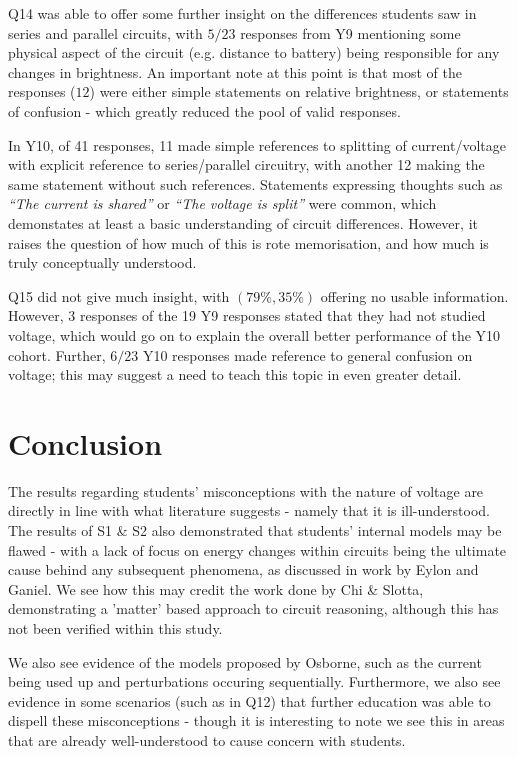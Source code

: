 \documentclass[a4paper,openany,nobib]{tufte-book}
\begin{document}

Q14 was able to offer some further insight on the differences students saw in series and parallel circuits, with $5/23 $ responses from Y9 mentioning some physical aspect of the circuit (e.g. distance to battery) being responsible for any changes in brightness. An important note at this point is that most of the responses ($12$) were either simple statements on relative brightness, or statements of confusion - which greatly reduced the pool of valid responses.

In Y10, of 41 responses, 11 made simple references to splitting of current/voltage with explicit reference to series/parallel circuitry, with another 12 making the same statement without such references. Statements expressing thoughts such as \emph{``The current is shared''} or \emph{``The voltage is split''} were common, which demonstates at least a basic understanding of circuit differences. However, it raises the question of how much of this is rote memorisation, and how much is truly conceptually understood.

Q15 did not give much insight, with $(79\%,35\%)$ offering no usable information. However, 3 responses of the 19 Y9 responses stated that they had not studied voltage, which would go on to explain the overall better performance of the Y10 cohort. Further, $6/23$ Y10 responses made reference to general confusion on voltage; this may suggest a need to teach this topic in even greater detail.
\chapter{Conclusion}%

The results regarding students' misconceptions with the nature of voltage are directly in line with what literature suggests - namely that it is ill-understood. The results of S1 \& S2 also demonstrated that students' internal models may be flawed - with a lack of focus on energy changes within circuits being the ultimate cause behind any subsequent phenomena, as discussed in work by Eylon and Ganiel. We see how this may credit the work done by Chi \& Slotta, demonstrating a 'matter' based approach to circuit reasoning, although this has not been verified within this study.

We also see evidence of the models proposed by Osborne, such as the current being used up and perturbations occuring sequentially. Furthermore, we also see evidence in some scenarios (such as in Q12) that further education was able to dispell these misconceptions - though it is interesting to note we see this in areas that are already well-understood to cause concern with students.
\end{document}
